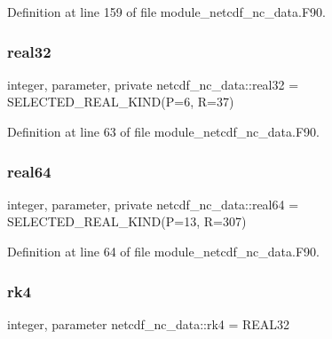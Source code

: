 Definition at line 159 of file module\+\_\+netcdf\+\_\+nc\+\_\+data.\+F90.

\mbox{\label{namespacenetcdf__nc__data_a49ce5cf5f98711e2fb1c1d1fff07ced3}} 
\subsubsection{\texorpdfstring{real32}{real32}}
{\footnotesize\ttfamily integer, parameter, private netcdf\+\_\+nc\+\_\+data\+::real32 = S\+E\+L\+E\+C\+T\+E\+D\+\_\+\+R\+E\+A\+L\+\_\+\+K\+I\+ND(P=6, R=37)\hspace{0.3cm}{\ttfamily [private]}}



Definition at line 63 of file module\+\_\+netcdf\+\_\+nc\+\_\+data.\+F90.

\mbox{\label{namespacenetcdf__nc__data_ab45e80c04977fcdc637bf85e96fb1bbd}} 
\subsubsection{\texorpdfstring{real64}{real64}}
{\footnotesize\ttfamily integer, parameter, private netcdf\+\_\+nc\+\_\+data\+::real64 = S\+E\+L\+E\+C\+T\+E\+D\+\_\+\+R\+E\+A\+L\+\_\+\+K\+I\+ND(P=13, R=307)\hspace{0.3cm}{\ttfamily [private]}}



Definition at line 64 of file module\+\_\+netcdf\+\_\+nc\+\_\+data.\+F90.

\mbox{\label{namespacenetcdf__nc__data_a223f303ec527e29600c338ab11a44f1e}} 
\subsubsection{\texorpdfstring{rk4}{rk4}}
{\footnotesize\ttfamily integer, parameter netcdf\+\_\+nc\+\_\+data\+::rk4 = R\+E\+A\+L32}



